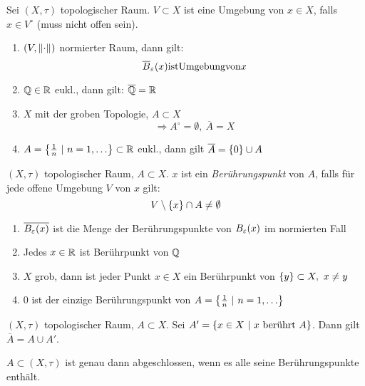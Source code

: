 \documentclass{skript}
\begin{document}
\begin{dfn}
    Sei $(X,\tau)$ topologischer Raum. $V\subset X$ ist eine Umgebung von $x\in X$,
    falls $x\in V^\circ$ (muss nicht offen sein).

    \begin{bsp}
        \begin{enumerate}
            \item $(V,\norm{\cdot})$ normierter Raum, dann gilt:
                \[\overline{B}_\varepsilon(x) \mathrm{ ist Umgebung von } x\]
            \item $\mathbb{Q}\in \mathbb{R}$ eukl., dann gilt: $\overline{\mathbb{Q}}=\mathbb{R}$
            \item $X$ mit der groben Topologie, $A\subset X$
                \[\Rightarrow A^\circ = \emptyset,\ \overline{A} = X\]
            \item $A=\mdef[\frac{1}{n}]{n = 1, \ldots}\subset\R$ eukl., dann gilt
                $\overline{A} = \mdef{0} \cup A$
        \end{enumerate}
    \end{bsp}
\end{dfn}

\begin{dfn}
    $(X,\tau)$ topologischer Raum, $A\subset X$. $x$ ist ein \emph{Berührungspunkt}
    von $A$, falls für jede offene Umgebung $V$ von $x$ gilt:
    \[V\setminus \mdef{x}\cap A\neq \emptyset\]
    \begin{bsp}
        \begin{enumerate}
            \item $\overline{B_\varepsilon(x)}$ ist die Menge der Berührungspunkte von
                $B_\varepsilon(x)$ im normierten Fall
            \item Jedes $x\in\mathbb{R}$ ist Berührpunkt von $\mathbb{Q}$
            \item $X$ grob, dann ist jeder Punkt $x\in X$ ein Berührpunkt von
                $\mdef{y}\subset X,\ x\neq y$
            \item $0$ ist der einzige Berührungspunkt von
                $A=\mdef[\frac{1}{n}]{n=1,\ldots}$
        \end{enumerate}
    \end{bsp}
\end{dfn}

\begin{stz}
    $(X,\tau)$ topologischer Raum, $A\subset X$. Sei $A' = \mdef[x\in X]
    {x\text{ berührt } A}$. Dann gilt $\overline{A} = A\cup A'$.

    \begin{krl}
        $A\subset (X,\tau)$ ist genau dann abgeschlossen, wenn es alle seine
        Berührungspunkte enthält.
    \end{krl}
\end{stz}
\end{document}

